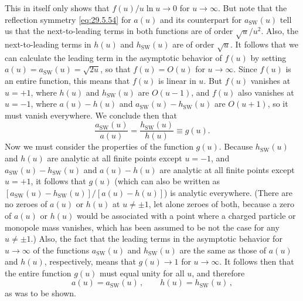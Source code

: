 This in itself only shows that \(f(u)/u\ln u\longrightarrow0\) for
\(u\longrightarrow\infty\). But note that the reflection symmetry
\eqref{eq:29.5.54} for \(a(u)\) and its counterpart for
\(a_{\mathrm{SW}}(u)\) tell us that the next-to-leading terms in both
functions are of order \(\sqrt{u}/u^2\). Also, the next-to-leading terms in
\(h(u)\) and \(h_{\mathrm{SW}}(u)\) are of order \(\sqrt{u}\). It follows
that we can calculate the leading term in the asymptotic behavior of \(f(u)\)
by setting \(a(u)=a_{\mathrm{SW}}(u)=\sqrt{2u}\), so that
\(f(u)=O(u)\) for \(u\longrightarrow\infty\). Since \(f(u)\) is an entire
function, this means that \(f(u)\) is linear in \(u\). But \(f(u)\) vanishes
at \(u=+1\), where \(h(u)\) and \(h_{\mathrm{SW}}(u)\) are \(O(u-1)\), and
\(f(u)\) also vanishes at \(u=-1\), where \(a(u)-h(u)\) and
\(a_{\mathrm{SW}}(u)-h_{\mathrm{SW}}(u)\) are \(O(u+1)\), so it must vanish
everywhere. We conclude then that
\begin{equation}
  \frac{a_{\mathrm{SW}}(u)}{a(u)}
  =\frac{h_{\mathrm{SW}}(u)}{h(u)}
  \equiv g(u).
  \tag{29.5.86}\label{eq:29.5.86}
\end{equation}
Now we must consider the properties of the function \(g(u)\). Because
\(h_{\mathrm{SW}}(u)\) and \(h(u)\) are analytic at all finite points except
\(u=-1\), and \(a_{\mathrm{SW}}(u)-h_{\mathrm{SW}}(u)\) and
\(a(u)-h(u)\) are analytic at all finite points except \(u=+1\), it follows
that \(g(u)\) (which can also be written as
\([a_{\mathrm{SW}}(u)-h_{\mathrm{SW}}(u)]/[a(u)-h(u)]\)) is analytic
everywhere. (There are no zeroes of \(a(u)\) or \(h(u)\) at \(u\ne\pm1\),
let alone zeroes of both, because a zero of \(a(u)\) or \(h(u)\) would be
associated with a point where a charged particle or monopole mass vanishes,
which has been assumed to be not the case for any \(u\ne\pm1\).) Also, the
fact that the leading terms in the asymptotic behavior for
\(u\longrightarrow\infty\) of the functions \(a_{\mathrm{SW}}(u)\) and
\(h_{\mathrm{SW}}(u)\) are the same as those of \(a(u)\) and \(h(u)\),
respectively, means that \(g(u)\longrightarrow1\) for
\(u\longrightarrow\infty\). It follows then that the entire function
\(g(u)\) must equal unity for all \(u\), and therefore
\begin{equation}
  a(u)=a_{\mathrm{SW}}(u)\,,
  \qquad
  h(u)=h_{\mathrm{SW}}(u)\,,
  \tag{29.5.87}\label{eq:29.5.87}
\end{equation}
as was to be shown.

